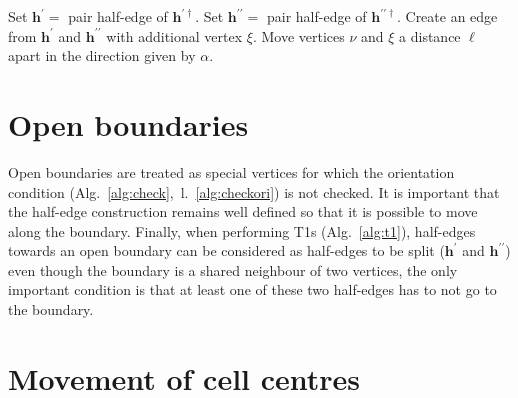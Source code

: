 \documentclass[aps, superscriptaddress, notitlepage, longbibliography]{revtex4-1}
\begin{document}
\begin{algorithm}[H]
\begin{algorithmic}[1]
\label{line:del}
 
    \STATE Set $\boldsymbol{h}^{\prime} =$ pair half-edge of $\boldsymbol{h}^{\prime\dagger}$. 
\ENDIF
{}
    \STATE Set $\boldsymbol{h}^{\prime\prime} =$ pair half-edge of $\boldsymbol{h}^{\prime\prime\dagger}$.
\ENDIF
{}
\STATE Create an edge from $\boldsymbol{h}^{\prime}$ and $\boldsymbol{h}^{\prime\prime}$ with additional vertex $\xi$. 
\STATE Move vertices $\nu$ and $\xi$ a distance $\ell$ apart in the direction given by $\alpha$.
\end{algorithmic}
\end{algorithm}

\section{Open boundaries}

Open boundaries are treated as special vertices for which the orientation condition (Alg.~\ref{alg:check},~l.~\ref{alg:checkori}) is not checked. It is important that the half-edge construction remains well defined so that it is possible to move along the boundary. Finally, when performing T1s (Alg.~\ref{alg:t1}), half-edges towards an open boundary can be considered as half-edges to be split ($\boldsymbol{h}^{\prime}$ and $\boldsymbol{h}^{\prime\prime}$) even though the boundary is a shared neighbour of two vertices, the only important condition is that at least one of these two half-edges has to not go to the boundary.

\section{Movement of cell centres}
\end{document}
